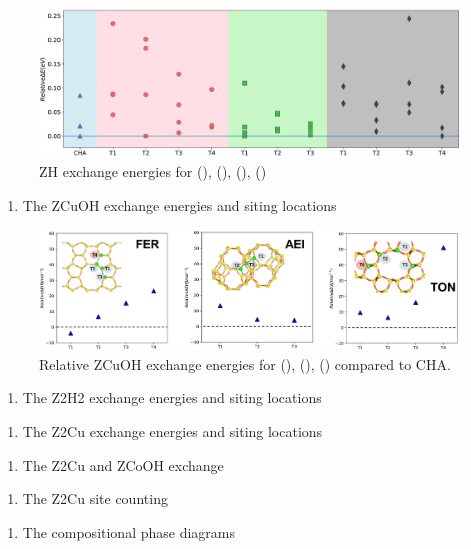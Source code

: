\documentclass[12pt]{article}
\begin{document}
\begin{figure}[H]
\centering
  \includegraphics[width=5.2in]{./Figures/Figure-1}
  \caption{ZH exchange energies for (), (), (), ()}
\end{figure}

\begin{enumerate}[resume]
\item The ZCuOH exchange energies and siting locations
\end{enumerate}

\begin{figure}[H]
\centering
  \includegraphics[width=5.2in]{./Figures/Figure-2}
  \caption{Relative ZCuOH exchange energies  for (), (), () compared to CHA.}
\end{figure}


\begin{enumerate}[resume]
\item The Z2H2 exchange energies and siting locations
\end{enumerate}
\begin{enumerate}[resume]
\item The Z2Cu exchange energies and siting locations
\end{enumerate}
\begin{enumerate}[resume]
\item The Z2Cu and ZCoOH exchange
\end{enumerate}
\begin{enumerate}[resume]
\item The Z2Cu site counting
\end{enumerate}
\begin{enumerate}[resume]
\item The compositional phase diagrams
\end{enumerate}
\end{document}
